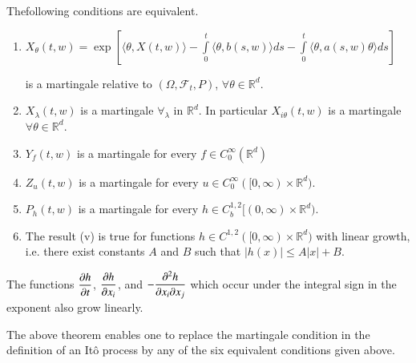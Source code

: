 \begin{theorem*}
The\pageoriginale following\label{page103} conditions are equivalent.
\begin{enumerate}
\renewcommand{\theenumi}{\roman{enumi}}
\renewcommand{\labelenumi}{\rm(\theenumi)}
\item $X_{\theta}(t,w)=\exp[\langle
  \theta,X(t,w)\rangle-\int\limits^{t}_{0}\langle \theta,
  b(s,w)\rangle ds-\int\limits^{t}_{0}\langle
  \theta,a(s,w)\theta\rangle ds]$

is a martingale relative to $(\Omega,\mathscr{F}_{t},P)$, $\forall
\theta \in \mathbb{R}^{d}$.

\item $X_{\lambda}(t,w)$ is a martingale $\forall_{\lambda}$ in
  $\mathbb{R}^{d}$. In particular $X_{i\theta}(t,w)$ is a martingale
  $\forall \theta\in \mathbb{R}^{d}$.

\item $Y_{f}(t,w)$ is a martingale for every $f\in
  C^{\infty}_{0}(\mathbb{R}^{d})$

\item $Z_{u}(t,w)$ is a martingale for every $u\in
  C^{\infty}_{0}([0,\infty)\times \mathbb{R}^{d})$.

\item $P_{h}(t,w)$ is a martingale for every $h\in
  C^{1,2}_{b}[(0,\infty)\times \mathbb{R}^{d})$.

\item The result (v) is true for functions $h\in
  C^{1,2}([0,\infty)\times \mathbb{R}^{d})$ with linear growth, i.e.\@
    there exist constants $A$ and $B$ such that $|h(x)|\leq A|x|+B$.
\end{enumerate}
\end{theorem*}

The functions $\dfrac{\partial h}{\partial t}$, $\dfrac{\partial h}{\partial x_{i}}$, and
$-\dfrac{\partial^{2}h}{\partial x_{i}\partial x_{j}}$ which occur under the integral
sign in the exponent also grow linearly.

\begin{remark*}
The above theorem enables one to replace the martingale condition in
the definition of an It\^o process by any of the six equivalent
conditions given above.
\end{remark*}

